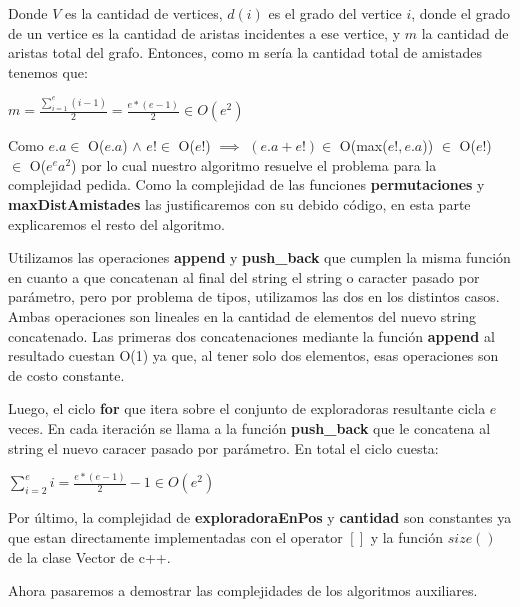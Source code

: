 Donde $V$ es la cantidad de vertices, $d(i)$ es el grado del vertice $i$, donde el grado de un vertice es la 
cantidad de aristas incidentes a ese vertice, y $m$ la cantidad de aristas total del grafo. Entonces, como
m sería la cantidad total de amistades tenemos que:

\vspace{5mm}

\begin{center}
$m = \frac{\sum\limits_{i=1}^e (i-1)}{2} = \frac{e*(e-1)}{2} \in O(e^2)$
\end{center}

\vspace{5mm}


Como $e.a \in $ O($e.a$) $\wedge$ $e! \in$ O($e!$) $\implies$ $(e.a + e!) \in$  O(max($e!,e.a$)) 
$\in$ O($e!$) $\in$ O($e^{e}a^{2}$) por lo cual nuestro algoritmo
resuelve el problema para la complejidad pedida. Como la complejidad de las funciones \textbf{permutaciones} 
y \textbf{maxDistAmistades} las justificaremos con su debido código, en esta parte explicaremos el resto del 
algoritmo. 

Utilizamos las operaciones \textbf{append} y \textbf{push\_back} que cumplen la misma función en cuanto a que
concatenan al final del string el string o caracter pasado por parámetro, pero por problema de tipos, 
utilizamos las dos en los distintos casos. Ambas operaciones son lineales en la cantidad de elementos del nuevo string concatenado.
Las primeras dos concatenaciones mediante la función \textbf{append} al resultado cuestan O(1) ya que, al 
tener solo dos elementos, esas operaciones son de costo constante.

Luego, el ciclo \textbf{for} que itera sobre el conjunto de exploradoras resultante cicla $e$ veces. En cada
iteración se llama a la función \textbf{push\_back} que le concatena al string el nuevo caracer pasado por parámetro.
En total el ciclo cuesta:

\begin{center}
  $\sum\limits_{i=2}^e i = \frac{e*(e-1)}{2} - 1 \in O(e^2)$
\end{center}

Por último, la complejidad de \textbf{exploradoraEnPos} y \textbf{cantidad} son constantes ya que estan
directamente implementadas con el operator $[]$ y la función $size()$ de la clase Vector de c++.

Ahora pasaremos a demostrar las complejidades de los algoritmos auxiliares.
